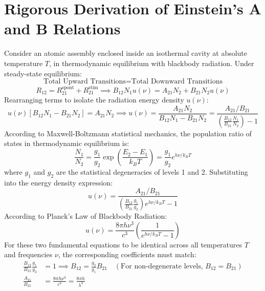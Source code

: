 \section{Rigorous Derivation of Einstein's A and B Relations}
Consider an atomic assembly enclosed inside an isothermal cavity at absolute temperature $T$, in thermodynamic equilibrium with blackbody radiation. Under steady-state equilibrium:
\begin{equation}
\text{Total Upward Transitions} = \text{Total Downward Transitions}
\end{equation}
\begin{equation}
R_{12} = R_{21}^{\text{spont}} + R_{21}^{\text{stim}} \implies B_{12} N_1 u(\nu) = A_{21} N_2 + B_{21} N_2 u(\nu)
\end{equation}
Rearranging terms to isolate the radiation energy density $u(\nu)$:
\begin{equation}
u(\nu) [B_{12} N_1 - B_{21} N_2] = A_{21} N_2 \implies u(\nu) = \frac{A_{21} N_2}{B_{12} N_1 - B_{21} N_2} = \frac{A_{21}/B_{21}}{\left(\frac{B_{12}}{B_{21}}\frac{N_1}{N_2}\right) - 1}
\end{equation}
According to Maxwell-Boltzmann statistical mechanics, the population ratio of states in thermodynamic equilibrium is:
\begin{equation}
\frac{N_1}{N_2} = \frac{g_1}{g_2} \exp\left(\frac{E_2 - E_1}{k_B T}\right) = \frac{g_1}{g_2} e^{h\nu / k_B T}
\end{equation}
where $g_1$ and $g_2$ are the statistical degeneracies of levels 1 and 2. Substituting into the energy density expression:
\begin{equation}
u(\nu) = \frac{A_{21}/B_{21}}{\left(\frac{B_{12}}{B_{21}}\frac{g_1}{g_2}\right) e^{h\nu/k_B T} - 1}
\end{equation}
According to Planck's Law of Blackbody Radiation:
\begin{equation}
u(\nu) = \frac{8\pi h \nu^3}{c^3}\left( \frac{1}{e^{h\nu/k_B T} - 1} \right)
\end{equation}
For these two fundamental equations to be identical across all temperatures $T$ and frequencies $\nu$, the corresponding coefficients must match:
\begin{align}
\frac{B_{12}}{B_{21}}\frac{g_1}{g_2} &= 1 \implies B_{12} = \frac{g_2}{g_1} B_{21} \quad (\text{For non-degenerate levels, } B_{12} = B_{21}) \\
\frac{A_{21}}{B_{21}} &= \frac{8\pi h \nu^3}{c^3} = \frac{8\pi h}{\lambda^3}
\end{align}

